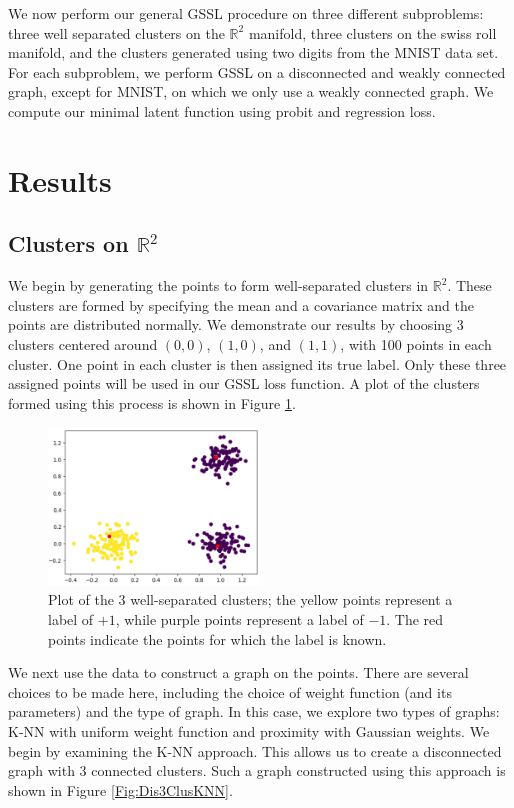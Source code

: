 \documentclass[12pt]{amsart}
\begin{document}
We now perform our general GSSL procedure on three different subproblems: three well separated clusters on the $\mathbb{R}^2$ manifold, three clusters on the swiss roll manifold, and the clusters generated using two digits from the MNIST data set. For each subproblem, we perform GSSL on a disconnected and weakly connected graph, except for MNIST, on which we only use a weakly connected graph. We compute our minimal latent function using probit and regression loss.

\section{Results}

\subsection{Clusters on $\mathbb{R}^2$}\label{Sec:3Clus}

We begin by generating the points to form well-separated clusters in $\mathbb{R}^2$. These clusters are formed by specifying the mean and a covariance matrix and the points are distributed normally. We demonstrate our results by choosing 3 clusters centered around $(0,0)$, $(1,0)$, and $(1,1)$, with 100 points in each cluster. One point in each cluster is then assigned its true label. Only these three assigned points will be used in our GSSL loss function. A plot of the clusters formed using this process is shown in Figure \ref{Fig:Dis3ClusOg}.

\begin{figure}
    \centering
    \includegraphics[width=0.5\textwidth]{Figures/Dis3ClusOG.png}
    \caption{
        Plot of the 3 well-separated clusters; the yellow points represent a label of $+1$, while purple points represent a label of $-1$. The red points indicate the points for which the label is known.}
	\label{Fig:Dis3ClusOg}
\end{figure}

We next use the data to construct a graph on the points. There are several choices to be made here, including the choice of weight function (and its parameters) and the type of graph. In this case, we explore two types of graphs: K-NN with uniform weight function and proximity with Gaussian weights. We begin by examining the K-NN approach. This allows us to create a disconnected graph with 3 connected clusters. Such a graph constructed using this approach is shown in Figure \ref{Fig:Dis3ClusKNN}.
\end{document}

